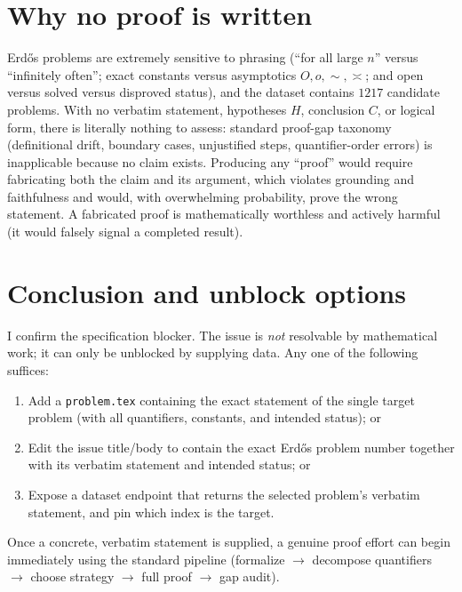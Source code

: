 \documentclass[12pt]{article}
\begin{document}
\section*{Why no proof is written}

Erd\H{o}s problems are extremely sensitive to phrasing (``for all large
$n$'' versus ``infinitely often''; exact constants versus asymptotics
$O,o,\sim,\asymp$; and open versus solved versus disproved status), and
the dataset contains $1217$ candidate problems. With no verbatim
statement, hypotheses $H$, conclusion $C$, or logical form, there is
literally nothing to assess: standard proof-gap taxonomy (definitional
drift, boundary cases, unjustified steps, quantifier-order errors) is
inapplicable because no claim exists. Producing any ``proof'' would
require fabricating both the claim and its argument, which violates
grounding and faithfulness and would, with overwhelming probability, prove
the wrong statement. A fabricated proof is mathematically worthless and
actively harmful (it would falsely signal a completed result).

\section*{Conclusion and unblock options}

I confirm the specification blocker. The issue is \emph{not} resolvable by
mathematical work; it can only be unblocked by supplying data. Any one of
the following suffices:
\begin{enumerate}
\item Add a \texttt{problem.tex} containing the exact statement of the
single target problem (with all quantifiers, constants, and intended
status); or
\item Edit the issue title/body to contain the exact Erd\H{o}s problem
number together with its verbatim statement and intended status; or
\item Expose a dataset endpoint that returns the selected problem's
verbatim statement, and pin which index is the target.
\end{enumerate}
Once a concrete, verbatim statement is supplied, a genuine proof effort
can begin immediately using the standard pipeline (formalize $\to$
decompose quantifiers $\to$ choose strategy $\to$ full proof $\to$ gap
audit).
\end{document}
